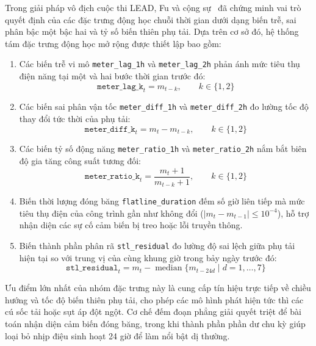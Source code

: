 Trong giải pháp vô địch cuộc thi LEAD, Fu và cộng sự~\cite{lead_winner} đã chứng minh vai trò quyết định của các đặc trưng động học chuỗi thời gian dưới dạng biến trễ, sai phân bậc một bậc hai và tỷ số biến thiên phụ tải. Dựa trên cơ sở đó, hệ thống tám đặc trưng động học mở rộng được thiết lập bao gồm:
\begin{enumerate}
    \item Các biến trễ vi mô \texttt{meter\_lag\_1h} và \texttt{meter\_lag\_2h} phản ánh mức tiêu thụ điện năng tại một và hai bước thời gian trước đó:
    \begin{equation*}
        \texttt{meter\_lag\_k}_t = m_{t-k}, \qquad k \in \{1,2\}
    \end{equation*}
    \item Các biến sai phân vận tốc \texttt{meter\_diff\_1h} và \texttt{meter\_diff\_2h} đo lường tốc độ thay đổi tức thời của phụ tải:
    \begin{equation*}
        \texttt{meter\_diff\_k}_t = m_t - m_{t-k}, \qquad k \in \{1,2\}
    \end{equation*}
    \item Các biến tỷ số động năng \texttt{meter\_ratio\_1h} và \texttt{meter\_ratio\_2h} nắm bắt biên độ gia tăng công suất tương đối:
    \begin{equation*}
        \texttt{meter\_ratio\_k}_t = \frac{m_t + 1}{m_{t-k} + 1}, \qquad k \in \{1,2\}
    \end{equation*}
    \item Biến thời lượng đóng băng \texttt{flatline\_duration} đếm số giờ liên tiếp mà mức tiêu thụ điện của công trình gần như không đổi ($|m_t - m_{t-1}| \leq 10^{-4}$), hỗ trợ nhận diện các sự cố cảm biến bị treo hoặc lỗi truyền thông.
    \item Biến thành phần phân rã \texttt{stl\_residual} đo lường độ sai lệch giữa phụ tải hiện tại so với trung vị của cùng khung giờ trong bảy ngày trước đó:
    \begin{equation*}
        \texttt{stl\_residual}_t = m_t - \operatorname{median}\{m_{t-24d} \mid d=1,\ldots,7\}
    \end{equation*}
\end{enumerate}

Ưu điểm lớn nhất của nhóm đặc trưng này là cung cấp tín hiệu trực tiếp về chiều hướng và tốc độ biến thiên phụ tải, cho phép các mô hình phát hiện tức thì các cú sốc tải hoặc sụt áp đột ngột. Cơ chế đếm đoạn phẳng giải quyết triệt để bài toán nhận diện cảm biến đóng băng, trong khi thành phần phần dư chu kỳ giúp loại bỏ nhịp điệu sinh hoạt 24 giờ để làm nổi bật dị thường.

